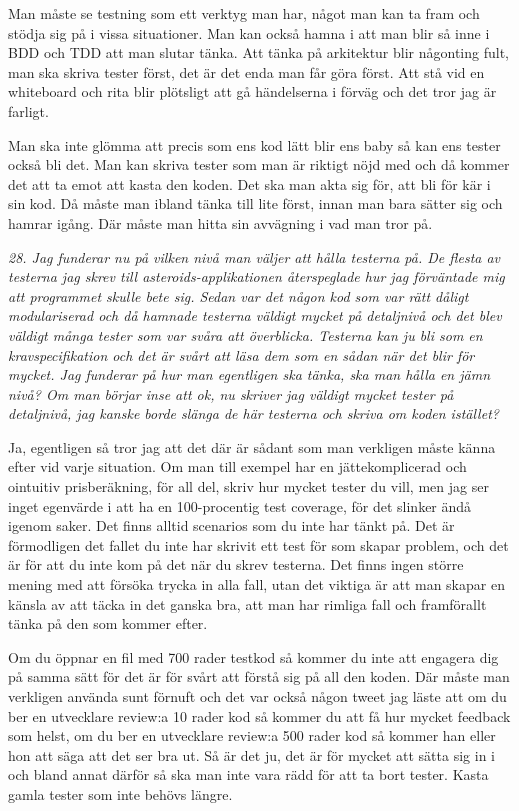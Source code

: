 \documentclass[11pt]{article}
\begin{document}
Man måste se testning som ett verktyg man har, något man kan ta fram och stödja sig på i vissa situationer. Man kan också hamna i att man blir så inne i BDD och TDD att man slutar tänka. Att tänka på arkitektur blir någonting fult, man ska skriva tester först, det är det enda man får göra först. Att stå vid en whiteboard och rita blir plötsligt att gå händelserna i förväg och det tror jag är farligt.

Man ska inte glömma att precis som ens kod lätt blir ens baby så kan ens tester också bli det. Man kan skriva tester som man är riktigt nöjd med och då kommer det att ta emot att kasta den koden. Det ska man akta sig för, att bli för kär i sin kod. Då måste man ibland tänka till lite först, innan man bara sätter sig och hamrar igång. Där måste man hitta sin avvägning i vad man tror på.

\emph{28. Jag funderar nu på vilken nivå man väljer att hålla testerna på. De flesta av testerna jag skrev till asteroids-applikationen återspeglade hur jag förväntade mig att programmet skulle bete sig. Sedan var det någon kod som var rätt dåligt modulariserad och då hamnade testerna väldigt mycket på detaljnivå och det blev väldigt många tester som var svåra att överblicka. Testerna kan ju bli som en kravspecifikation och det är svårt att läsa dem som en sådan när det blir för mycket. Jag funderar på hur man egentligen ska tänka, ska man hålla en jämn nivå? Om man börjar inse att ok, nu skriver jag väldigt mycket tester på detaljnivå, jag kanske borde slänga de här testerna och skriva om koden istället?}

Ja, egentligen så tror jag att det där är sådant som man verkligen måste känna efter vid varje situation. Om man till exempel har en jättekomplicerad och ointuitiv prisberäkning, för all del, skriv hur mycket tester du vill, men jag ser inget egenvärde i att ha en 100-procentig test coverage, för det slinker ändå igenom saker. Det finns alltid scenarios som du inte har tänkt på. Det är förmodligen det fallet du inte har skrivit ett test för som skapar problem, och det är för att du inte kom på det när du skrev testerna. Det finns ingen större mening med att försöka trycka in alla fall, utan det viktiga är att man skapar en känsla av att täcka in det ganska bra, att man har rimliga fall och framförallt tänka på den som kommer efter.

Om du öppnar en fil med 700 rader testkod så kommer du inte att engagera dig på samma sätt för det är för svårt att förstå sig på all den koden. Där måste man verkligen använda sunt förnuft och det var också någon tweet jag läste att om du ber en utvecklare review:a 10 rader kod så kommer du att få hur mycket feedback som helst, om du ber en utvecklare review:a 500 rader kod så kommer han eller hon att säga att det ser bra ut. Så är det ju, det är för mycket att sätta sig in i och bland annat därför så ska man inte vara rädd för att ta bort tester. Kasta gamla tester som inte behövs längre.
\end{document}
